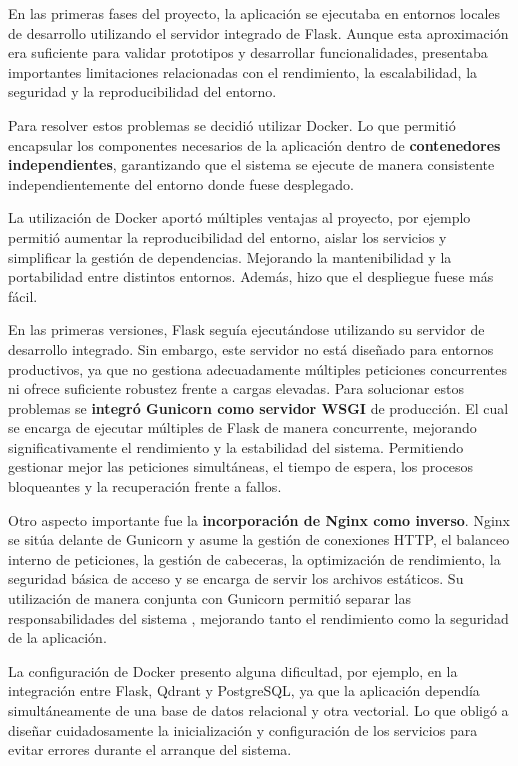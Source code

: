 En las primeras fases del proyecto, la aplicación se ejecutaba en entornos locales de desarrollo utilizando el servidor integrado de Flask. Aunque esta aproximación era suficiente para validar prototipos y desarrollar funcionalidades, presentaba importantes limitaciones relacionadas con el rendimiento, la escalabilidad, la seguridad y la reproducibilidad del entorno.

Para resolver estos problemas se decidió utilizar Docker. Lo que permitió encapsular los componentes necesarios de la aplicación dentro de \textbf{contenedores independientes}, garantizando que el sistema se ejecute de manera consistente independientemente del entorno donde fuese desplegado. 

La utilización de Docker aportó múltiples ventajas al proyecto, por ejemplo permitió aumentar la reproducibilidad del entorno, aislar los servicios y simplificar la gestión de dependencias. Mejorando la mantenibilidad y la portabilidad entre distintos entornos. Además, hizo que el despliegue fuese más fácil. 

En las primeras versiones, Flask seguía ejecutándose utilizando su servidor de desarrollo integrado. Sin embargo, este servidor no está diseñado para entornos productivos, ya que no gestiona adecuadamente múltiples peticiones concurrentes ni ofrece suficiente robustez frente a cargas elevadas. Para solucionar estos problemas se \textbf{integró Gunicorn como servidor WSGI} de producción. El cual se encarga de ejecutar múltiples  de Flask de manera concurrente, mejorando significativamente el rendimiento y la estabilidad del sistema. Permitiendo gestionar mejor las peticiones simultáneas, el tiempo de espera, los procesos bloqueantes y la recuperación frente a fallos.

Otro aspecto importante fue la \textbf{incorporación de Nginx como  inverso}. Nginx se sitúa delante de Gunicorn y asume la gestión de conexiones HTTP, el balanceo interno de peticiones, la gestión de cabeceras, la optimización de rendimiento, la seguridad básica de acceso y se encarga de servir los archivos estáticos. Su utilización de manera conjunta con Gunicorn permitió separar las responsabilidades del sistema , mejorando tanto el rendimiento como la seguridad de la aplicación.

La configuración de Docker presento alguna dificultad, por ejemplo, en la integración entre Flask, Qdrant y PostgreSQL, ya que la aplicación dependía simultáneamente de una base de datos relacional y otra vectorial. Lo que obligó a diseñar cuidadosamente la inicialización y configuración de los servicios para evitar errores durante el arranque del sistema.

